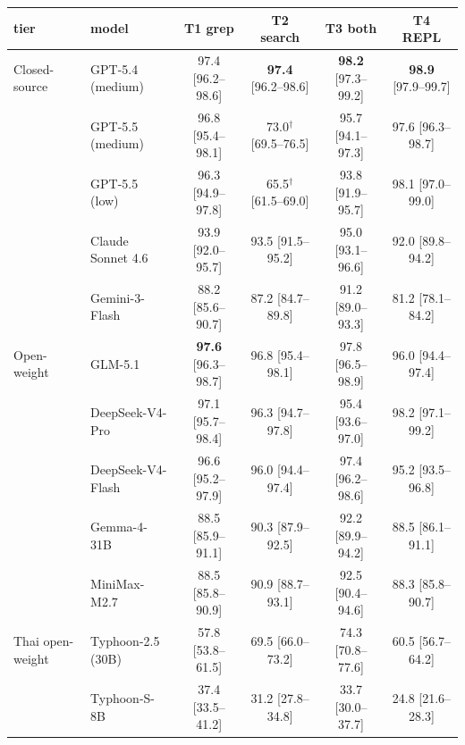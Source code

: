 \begin{tabular}{@{}llcccc@{}}
\toprule
\textbf{tier} & \textbf{model} & \textbf{T1 grep} & \textbf{T2 search} & \textbf{T3 both} & \textbf{T4 REPL} \\
\midrule
Closed-source & GPT-5.4 (medium) & 97.4 [96.2--98.6] & \textbf{97.4} [96.2--98.6] & \textbf{98.2} [97.3--99.2] & \textbf{98.9} [97.9--99.7] \\
 & GPT-5.5 (medium) & 96.8 [95.4--98.1] & 73.0$^{\dagger}$ [69.5--76.5] & 95.7 [94.1--97.3] & 97.6 [96.3--98.7] \\
 & GPT-5.5 (low) & 96.3 [94.9--97.8] & 65.5$^{\dagger}$ [61.5--69.0] & 93.8 [91.9--95.7] & 98.1 [97.0--99.0] \\
 & Claude Sonnet 4.6 & 93.9 [92.0--95.7] & 93.5 [91.5--95.2] & 95.0 [93.1--96.6] & 92.0 [89.8--94.2] \\
 & Gemini-3-Flash & 88.2 [85.6--90.7] & 87.2 [84.7--89.8] & 91.2 [89.0--93.3] & 81.2 [78.1--84.2] \\
Open-weight & GLM-5.1 & \textbf{97.6} [96.3--98.7] & 96.8 [95.4--98.1] & 97.8 [96.5--98.9] & 96.0 [94.4--97.4] \\
 & DeepSeek-V4-Pro & 97.1 [95.7--98.4] & 96.3 [94.7--97.8] & 95.4 [93.6--97.0] & 98.2 [97.1--99.2] \\
 & DeepSeek-V4-Flash & 96.6 [95.2--97.9] & 96.0 [94.4--97.4] & 97.4 [96.2--98.6] & 95.2 [93.5--96.8] \\
 & Gemma-4-31B & 88.5 [85.9--91.1] & 90.3 [87.9--92.5] & 92.2 [89.9--94.2] & 88.5 [86.1--91.1] \\
 & MiniMax-M2.7 & 88.5 [85.8--90.9] & 90.9 [88.7--93.1] & 92.5 [90.4--94.6] & 88.3 [85.8--90.7] \\
Thai open-weight & Typhoon-2.5 (30B) & 57.8 [53.8--61.5] & 69.5 [66.0--73.2] & 74.3 [70.8--77.6] & 60.5 [56.7--64.2] \\
 & Typhoon-S-8B & 37.4 [33.5--41.2] & 31.2 [27.8--34.8] & 33.7 [30.0--37.7] & 24.8 [21.6--28.3] \\
\bottomrule
\end{tabular}
